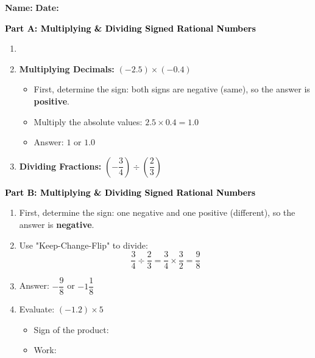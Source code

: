 \documentclass[12pt, letterpaper, fleqn]{article}
\newcommand{\blankshorter}{\underline{\hspace{1.5cm}}}
\begin{document}
\textbf{Name:} \underline{\hspace{5cm}}
\hfill
\textbf{Date:} \underline{\hspace{3cm}}\\

\begin{tcolorbox}[colback=customteal!20]
\large\textcolor{black}{\textbf{Part A: Multiplying \& Dividing Signed Rational Numbers}}
\end{tcolorbox}

\vspace{3mm}

\begin{enumerate}[itemsep=2.2cm, leftmargin=0.6cm]
\item [label=\textbf{\Alph*.}]
\item \textbf{Multiplying Decimals:} $(-2.5) \times (-0.4)$
    \begin{itemize}
\item First, determine the sign: both signs are negative (same), so the answer is \textbf{positive}.
\item Multiply the absolute values: $2.5 \times 0.4 = 1.0$
\item Answer: $1$ or $1.0$
    \end{itemize}
    
    \medskip
\item \textbf{Dividing Fractions:} $\left(-\dfrac{3}{4}\right) \div \left(\dfrac{2}{3}\right)$
    \end{enumerate}

\newpage

\begin{tcolorbox}[colback=customteal!20]
\large\textcolor{black}{\textbf{Part B: Multiplying \& Dividing Signed Rational Numbers}}
\end{tcolorbox}

\vspace{3mm}

\begin{enumerate}[itemsep=2.2cm, leftmargin=0.6cm, resume]
\item First, determine the sign: one negative and one positive (different), so the answer is \textbf{negative}.
\item Use "Keep-Change-Flip" to divide:
        \[
        \frac{3}{4} \div \frac{2}{3} = \frac{3}{4} \times \frac{3}{2} = \frac{9}{8}
        \]
\item Answer: $-\dfrac{9}{8}$ or $-1\dfrac{1}{8}$
\item Evaluate: $(-1.2) \times 5$
\vspace{0.5cm}
\begin{itemize}
\item Sign of the product: \blankshorter
\item Work:
    \vspace{1.5cm}
\end{itemize}
\end{enumerate}
\end{document}
